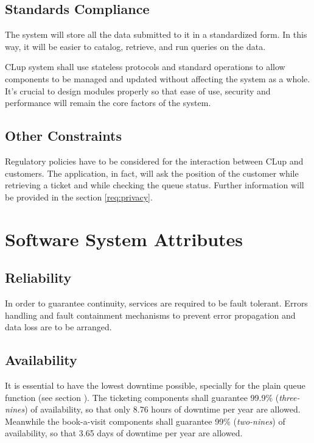 \subsection{Standards Compliance}
The system will store all the data submitted to it in a standardized form. In this way, it will be easier to catalog, retrieve, and run queries on the data.

CLup system shall use stateless protocols and standard operations to allow components to be managed and updated without affecting the system as a whole.\newline
It’s crucial to design modules properly so that ease of use, security and performance will remain the core factors of the system.

\subsection{Other Constraints}
Regulatory policies have to be considered for the interaction between CLup and customers. The application, in fact, will ask the position of the customer while retrieving a ticket and while checking the queue status. Further information will be provided in the section \ref{req:privacy}.

\section{Software System Attributes}

\subsection{Reliability}
In order to guarantee continuity, services are required to be fault tolerant. Errors handling and fault containment mechanisms to prevent error propagation and data loss are to be arranged.

\subsection{Availability}
It is essential to have the lowest downtime possible, specially for the plain queue function (see section ).
The ticketing components shall guarantee 99.9\% (\textit{three-nines}) of availability, so that only 8.76 hours of downtime per year are allowed.
Meanwhile the book-a-visit components shall guarantee 99\% (\textit{two-nines}) of availability, so that 3.65 days of downtime per year are allowed.

